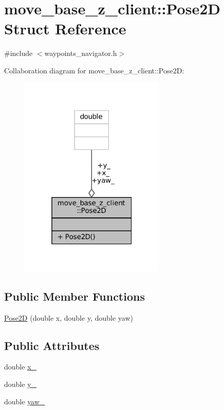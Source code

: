 \hypertarget{structmove__base__z__client_1_1Pose2D}{}\section{move\+\_\+base\+\_\+z\+\_\+client\+:\+:Pose2D Struct Reference}
\label{structmove__base__z__client_1_1Pose2D}


{\ttfamily \#include $<$waypoints\+\_\+navigator.\+h$>$}



Collaboration diagram for move\+\_\+base\+\_\+z\+\_\+client\+:\+:Pose2D\+:
\nopagebreak
\begin{figure}[H]
\begin{center}
\leavevmode
\includegraphics[width=196pt]{structmove__base__z__client_1_1Pose2D__coll__graph}
\end{center}
\end{figure}
\subsection*{Public Member Functions}
\begin{DoxyCompactItemize}
\item 
\hyperlink{structmove__base__z__client_1_1Pose2D_a97f60b5516b80f09472f178afd07b7ab}{Pose2D} (double x, double y, double yaw)
\end{DoxyCompactItemize}
\subsection*{Public Attributes}
\begin{DoxyCompactItemize}
\item 
double \hyperlink{structmove__base__z__client_1_1Pose2D_a92b53110c2fdd77c18275d6e16709581}{x\+\_\+}
\item 
double \hyperlink{structmove__base__z__client_1_1Pose2D_a10e59f372c758bffb00bfaaca43ec1fc}{y\+\_\+}
\item 
double \hyperlink{structmove__base__z__client_1_1Pose2D_a75fda2f20515d0acdb83d33017e6c97e}{yaw\+\_\+}
\end{DoxyCompactItemize}


